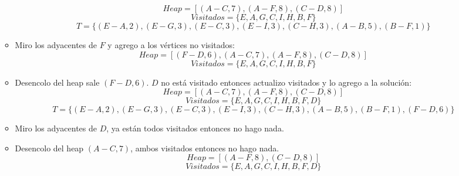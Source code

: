 \documentclass{article}
\begin{document}
\begin{enumerate}[label=\alph*)]
\begin{itemize}
                \begin{equation*}
                    Heap = [(A-C, 7), (A-F, 8), (C-D, 8)]
                \end{equation*}
                \begin{equation*}
                    Visitados = \{E, A, G, C, I, H, B, F\}
                \end{equation*}
                \begin{equation*}
                    T = \{(E-A, 2), (E-G, 3), (E-C, 3), (E-I, 3), (C-H, 3), (A-B, 5), (B-F, 1)\}
                \end{equation*}
            \item Miro los adyacentes de $F$ y agrego a los vértices no visitados:
                \begin{equation*}
                    Heap = [(F-D, 6), (A-C, 7), (A-F, 8), (C-D, 8)]
                \end{equation*}
                \begin{equation*}
                    Visitados = \{E, A, G, C, I, H, B, F\}
                \end{equation*}
            \item Desencolo del heap sale $(F-D, 6)$. $D$ no está visitado entonces actualizo visitados y lo agrego a la solución:
                \begin{equation*}
                    Heap = [(A-C, 7), (A-F, 8), (C-D, 8)]
                \end{equation*}
                \begin{equation*}
                    Visitados = \{E, A, G, C, I, H, B, F, D\}
                \end{equation*}
                \begin{equation*}
                    T = \{(E-A, 2), (E-G, 3), (E-C, 3), (E-I, 3), (C-H, 3), (A-B, 5), (B-F, 1), (F-D, 6)\}
                \end{equation*}
            \item Miro los adyacentes de $D$, ya están todos visitados entonces no hago nada.
            \item Desencolo del heap $(A-C, 7)$, ambos visitados entonces no hago nada.
                \begin{equation*}
                    Heap = [(A-F, 8), (C-D, 8)]
                \end{equation*}
                \begin{equation*}
                    Visitados = \{E, A, G, C, I, H, B, F, D\}

\end{equation*}
\end{itemize}
\end{enumerate}
\end{document}
